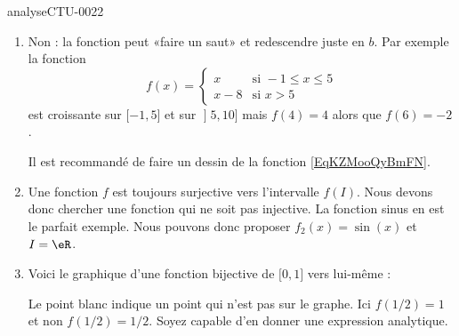 
\begin{corrige}{analyseCTU-0022}

    \begin{enumerate}
        \item
            Non : la fonction peut «faire un saut» et redescendre juste en \( b\). Par exemple la fonction
            \begin{equation}    \label{EqKZMooQyBmFN}
                f(x)=\begin{cases}
                    x    &   \text{si } -1\leq x\leq 5\\
                    x-8    &    \text{si } x>5
                \end{cases}
            \end{equation}
            est croissante sur \( \mathopen[ -1 , 5 \mathclose]\) et sur \( \mathopen] 5 , 10 \mathclose]\) mais \( f(4)=4\) alors que \( f(6)=-2\).

            Il est recommandé de faire un dessin de la fonction \eqref{EqKZMooQyBmFN}.

        \item
            Une fonction \( f\) est toujours surjective vers l'intervalle \( f(I)\). Nous devons donc chercher une fonction qui ne soit pas injective. La fonction sinus en est le parfait exemple. Nous pouvons donc proposer \( f_2(x)=\sin(x)\) et \( I=\eR\).
        \item
            Voici le graphique d'une fonction bijective de \( \mathopen[ 0 , 1 \mathclose]\) vers lui-même :
\begin{center}
   
\end{center}
Le point blanc indique un point qui n'est pas sur le graphe. Ici \( f(1/2)=1\) et non \( f(1/2)=1/2\).
Soyez capable d'en donner une expression analytique.

    \end{enumerate}

\end{corrige}
